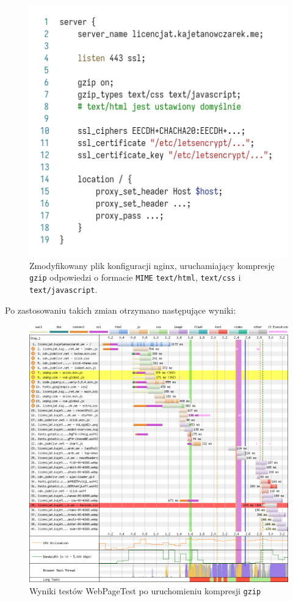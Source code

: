 \documentclass[licencjacka]{pracadypl}
\begin{document}
\begin{figure}[H]
  \centering
  \includegraphics[width=\linewidth/\real{1.55}]{images/code-nginx-conf-trunc-gzip.png}
  \caption{Zmodyfikowany plik konfiguracji nginx, uruchamiający kompresję \texttt{gzip} odpowiedzi o formacie \texttt{MIME} \texttt{text/html}, \texttt{text/css} i \texttt{text/javascript}.}
  \label{fig:nginx-after-gzip}
\end{figure}

Po zastosowaniu takich zmian otrzymano następujące wyniki:
\begin{figure}[H]
  \centering
  \includegraphics[width=\linewidth/\real{1.05}]{images/waterfall-after-gzip.png}
  \caption{Wyniki testów WebPageTest po uruchomieniu kompresji \texttt{gzip}}
  \label{fig:waterfall-after-gzip}
\end{figure}
\end{document}
